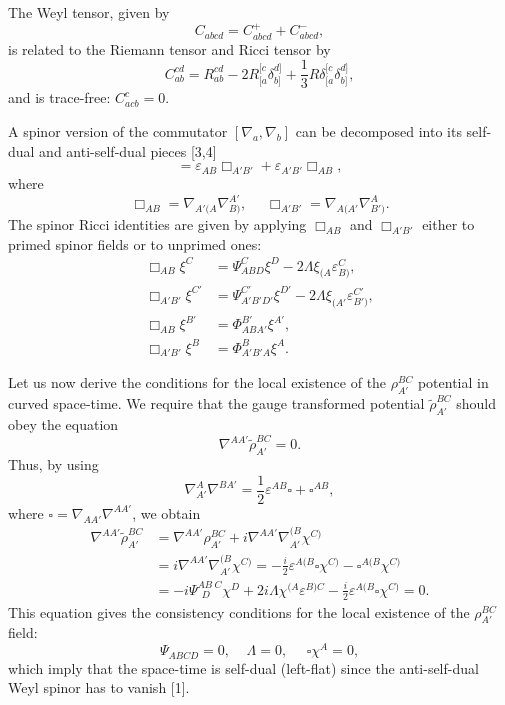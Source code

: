 \documentclass[a4paper,12pt]{article}
\begin{document}
The Weyl tensor, given by
\begin{equation}
C_{abcd}=C^{+}_{abcd}+C^{-}_{abcd},
\end{equation}
is related to the Riemann tensor and Ricci tensor by
\begin{equation}
C_{ab}^{cd}=R_{ab}^{cd}-2R_{[a}^{[c}\delta_{b]}^{d]}+\frac{1}{3}R\delta_{[a}^{[c}\delta_{b]}^{d]},
\end{equation}
and is trace-free: $C_{acb}^c=0$.

A spinor version of the commutator $[\nabla_a,\nabla_b]$ can be decomposed into its self-dual and anti-self-dual pieces [3,4]
\begin{equation}
[\nabla_a,\nabla_b]=\varepsilon_{AB}\Box_{A'B'}+\varepsilon_{A'B'}\Box_{AB},
\end{equation}
where
\begin{equation}
\Box_{AB}=\nabla_{A'(A}\nabla_{B)}^{A'},\ \ \ \ \ \ 
\Box_{A'B'}=\nabla_{A(A'}\nabla_{B')}^{A}.
\end{equation}
The spinor Ricci identities are given by applying $\Box_{AB}$ and $\Box_{A'B'}$ either to primed spinor fields or to unprimed ones:
\begin{align}
\Box_{AB}\xi^C &= \Psi_{ABD}^C\xi^D-2\Lambda\xi_{(A}\varepsilon_{B)}^C,\\
\Box_{A'B'}\xi^{C'} &= \Psi_{A'B'D'}^{C'}\xi^{D'}-2\Lambda\xi_{(A'}\varepsilon_{B')}^{C'},\\
\Box_{AB}\xi^{B'} &= \Phi_{ABA'}^{B'}\xi^{A'},\\
\Box_{A'B'}\xi^B &= \Phi_{A'B'A}^{B}\xi^{A}.
\end{align}

Let us now derive the conditions for the local existence of the $\rho_{A'}^{BC}$ potential in curved space-time. We require that the gauge transformed potential $\tilde\rho_{A'}^{BC}$ should obey the equation
\begin{equation}
\nabla^{AA'}\tilde\rho_{A'}^{BC}=0.
\end{equation}
Thus, by using 
\begin{equation}
\nabla^A_{A'}\nabla^{BA'}=\frac{1}{2}\varepsilon^{AB}\square +\square^{AB},
\end{equation} 
where $\square=\nabla_{AA'}\nabla^{AA'}$, we obtain
\begin{equation}
\begin{split}
\nabla^{AA'}\tilde\rho_{A'}^{BC}&=\nabla^{AA'}\rho^{BC}_{A'}+i\nabla^{AA'}\nabla^{(B}_{A'}\chi^{C)}\\
&=i\nabla^{AA'}\nabla^{(B}_{A'}\chi^{C)}=-\frac{i}{2}\varepsilon^{A(B}\square\chi^{C)}-\square^{A(B}\chi^{C)}\\
&=-i\Psi^{AB\ C}_{\ \ D}\chi^D+2i\Lambda\chi^{(A}\varepsilon^{B)C}-\frac{i}{2}\varepsilon^{A(B}\square\chi^{C)}=0.
\end{split}
\end{equation}
This equation gives the consistency conditions for the local existence of the $\rho_{A'}^{BC}$ field:
\begin{equation}
\Psi_{ABCD}=0,\ \ \ \ \ \Lambda=0,\ \ \ \ \ \ \square\chi^A=0,
\end{equation}
which imply that the space-time is self-dual (left-flat) since the anti-self-dual Weyl spinor has to vanish [1].
\end{document}
